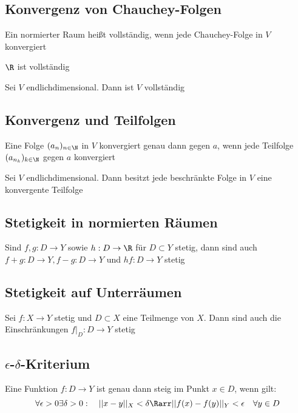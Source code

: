 	\subsection{Konvergenz von Chauchey-Folgen}
		\begin{Definition} [Vollständig]
			Ein normierter Raum heißt vollständig, wenn jede Chauchey-Folge in $V$ konvergiert
		\end{Definition}
		\begin{Satz} [ ]
			$\R$ ist vollständig
		\end{Satz}
		\begin{Satz} [ ]
			Sei $V$ endlichdimensional. Dann ist $V$ vollständig
		\end{Satz}
	\subsection{Konvergenz und Teilfolgen}
		\begin{Satz} [ ]
			Eine Folge $(a_n)_{n\in \N}$ in $V$ konvergiert genau dann gegen $a$, wenn jede Teilfolge $(a_{n_k})_{k\in\N}$ gegen $a$ konvergiert
		\end{Satz}
		\begin{Satz} 
			Sei $V$ endlichdimensional. Dann besitzt jede beschränkte Folge in $V$ eine konvergente Teilfolge
		\end{Satz}
	\subsection{Stetigkeit in normierten Räumen}
		\begin{Satz} [ ]
					Sind $f, g: D\to Y$ sowie $h: D\to \R$ für $D\subset Y$ stetig, dann sind auch $f + g: D\to Y, f-g: D\to Y$ und $hf: D\to Y$ stetig
		\end{Satz}
	\subsection{Stetigkeit auf Unterräumen}
		\begin{Satz} [ ]
			Sei $f: X\to Y$ stetig und $D \subset X$ eine Teilmenge von $X$. Dann sind auch die Einschränkungen $f|_D:D\to Y$ stetig
		\end{Satz}
	\subsection{$\epsilon$-$\delta$-Kriterium}
		\begin{Satz} [ ]
			Eine Funktion $f: D\to Y$ ist genau dann steig im Punkt $x\in D$, wenn gilt:
			$$
				\forall \epsilon > 0\exists\delta>0: \quad ||x-y||_X < \delta \Rarr ||f(x)-f(y)||_Y<\epsilon \quad \forall y\in D
			$$
		\end{Satz}
